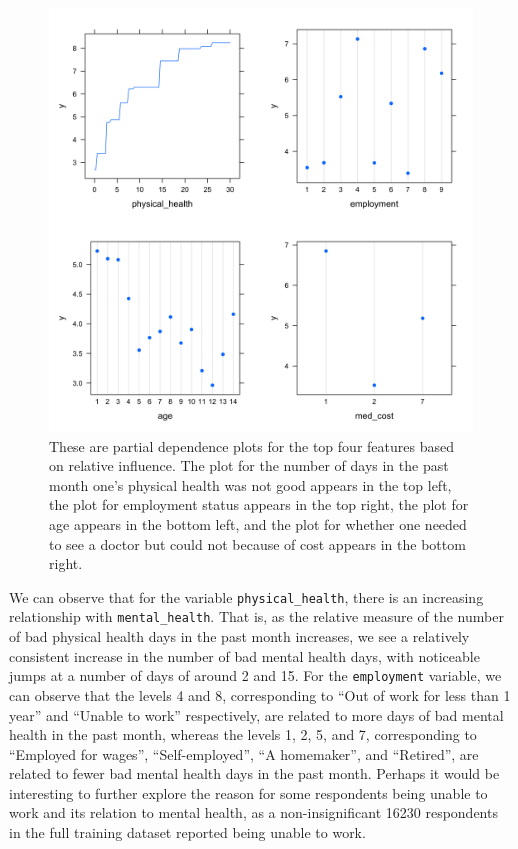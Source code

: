 \documentclass[
]{article}
\begin{document}
\begin{figure}[H]

{\centering \includegraphics[width=0.95\linewidth]{../results/partial-dependence-plots} 

}

\caption{These are partial dependence plots for the top four features based on relative influence. The plot for the number of days in the past month one's physical health was not good appears in the top left, the plot for employment status appears in the top right, the plot for age appears in the bottom left, and the plot for whether one needed to see a doctor but could not because of cost appears in the bottom right.}\label{fig:partial-dependence-plots}
\end{figure}

We can observe that for the variable \texttt{physical\_health}, there is an increasing relationship with \texttt{mental\_health}. That is, as the relative measure of the number of bad physical health days in the past month increases, we see a relatively consistent increase in the number of bad mental health days, with noticeable jumps at a number of days of around 2 and 15. For the \texttt{employment} variable, we can observe that the levels 4 and 8, corresponding to ``Out of work for less than 1 year'' and ``Unable to work'' respectively, are related to more days of bad mental health in the past month, whereas the levels 1, 2, 5, and 7, corresponding to ``Employed for wages'', ``Self-employed'', ``A homemaker'', and ``Retired'', are related to fewer bad mental health days in the past month. Perhaps it would be interesting to further explore the reason for some respondents being unable to work and its relation to mental health, as a non-insignificant 16230 respondents in the full training dataset reported being unable to work.
\end{document}
